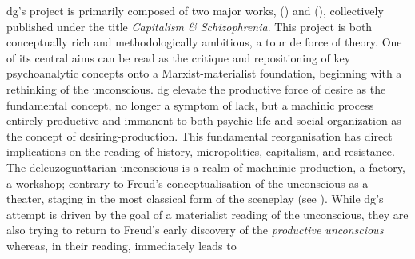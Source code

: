 \Gls{dg}’s project is primarily composed of two major works,  (\cite*{deleuze1983}) and  (\cite*{deleuze1987}), collectively published under the title \textit{Capitalism \& Schizophrenia}. This project is both conceptually rich and methodologically ambitious, a tour de force of theory. One of its central aims can be read as the critique and repositioning of key psychoanalytic concepts onto a Marxist-materialist foundation, beginning with a rethinking of the unconscious. \Gls{dg} elevate the productive force of desire as the fundamental concept, no longer a symptom of lack, but a machinic process entirely productive and immanent to both psychic life and social organization as the concept of desiring-production. This fundamental reorganisation has direct implications on the reading of history, micropolitics, capitalism, and resistance.
%
%
The deleuzoguattarian unconscious is a realm of machninic production, a
factory, a workshop; contrary
to Freud's conceptualisation of the unconscious as a theater, staging in the
most classical form of the sceneplay (see \cite[54]{deleuze1983} ).
While \gls{dg}'s attempt is driven by the goal of a materialist reading of the
unconscious, they are also trying to return to Freud's early discovery of the
\textit{productive unconscious} whereas, in their reading, immediately leads to
